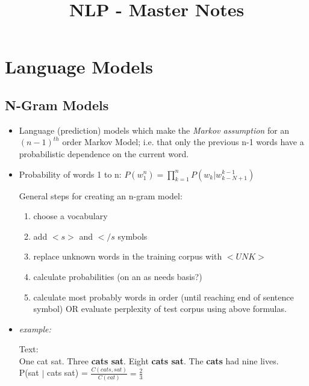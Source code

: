 \documentclass[a4paper]{article}
\title{NLP - Master Notes}
\begin{document}
	\maketitle
	
	\section{Language Models}
	
	\subsection{N-Gram Models}
	
	\begin{itemize}
	
		\item Language (prediction) models which make the \textit{Markov assumption} for an $(n-1)^{th}$ order Markov Model; i.e. that only the previous n-1 words have a probabilistic dependence on the current word.
		
		\item Probability of words 1 to n: $P(w_1^n) = \prod_{k=1}^{n}P(w_k | w_{k-N+1}^{k-1})$
		
		General steps for creating an n-gram model:		
		\begin{enumerate}
			\item choose a vocabulary 
			\item add $<s>$ and $</s$ symbols 
			\item replace unknown words in the training corpus with $<UNK>$ 
			\item calculate probabilities (on an as needs basis?)
			\item calculate most probably words in order (until reaching end of sentence symbol) OR evaluate perplexity of test corpus using above formulas.
			
		\end{enumerate}
		
		\item \textit{example:} 
		
		\begin{center}
			Text: \\
			One cat sat. Three \textbf{cats sat}. Eight \textbf{cats sat}. The \textbf{cats} had nine lives. 	\\
			
			P(sat $|$ cats sat) = $\frac{C(cats,sat)}{C(cat)} = \frac{2}{3}$
			
		\end{center}
		

\end{itemize}
\end{document}
